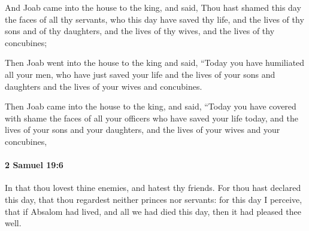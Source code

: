 			\begin{versebox}
					\item[BHS] 
					\item[ASV] And Joab came into the house to the king, and said, Thou hast shamed this day the faces of all thy servants, who this day have saved thy life, and the lives of thy sons and of thy daughters, and the lives of thy wives, and the lives of thy concubines;
					\item[NIV] Then Joab went into the house to the king and said, “Today you have humiliated all your men, who have just saved your life and the lives of your sons and daughters and the lives of your wives and concubines.
					\item[NRSV] Then Joab came into the house to the king, and said, “Today you have covered with shame the faces of all your officers who have saved your life today, and the lives of your sons and your daughters, and the lives of your wives and your concubines,
			\end{versebox}

		\paragraph{2 Samuel 19:6} %
			\label{2SAMUEL-19-6}

			In that thou lovest thine enemies, and hatest thy friends. For thou hast declared this day, that thou regardest neither princes nor servants: for this day I perceive, that if Absalom had lived, and all we had died this day, then it had pleased thee well.

